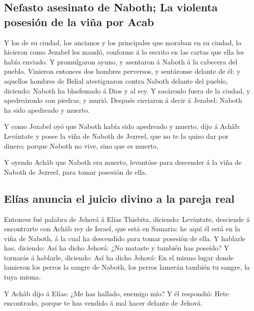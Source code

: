 \hypertarget{nefasto-asesinato-de-naboth-la-violenta-posesiuxf3n-de-la-viuxf1a-por-acab}{%
\subsection{Nefasto asesinato de Naboth; La violenta posesión de la viña
por
Acab}\label{nefasto-asesinato-de-naboth-la-violenta-posesiuxf3n-de-la-viuxf1a-por-acab}}

 Y los de su ciudad, los ancianos y los principales que
moraban en su ciudad, lo hicieron como Jezabel les mandó, conforme á lo
escrito en las cartas que ella les había enviado.  Y
promulgaron ayuno, y asentaron á Naboth á la cabecera del pueblo.
 Vinieron entonces dos hombres perversos, y sentáronse
delante de él: y aquellos hombres de Belial atestiguaron contra Naboth
delante del pueblo, diciendo: Naboth ha blasfemado á Dios y al rey. Y
sacáronlo fuera de la ciudad, y apedreáronlo con piedras, y murió.
 Después enviaron á decir á Jezabel: Naboth ha sido
apedreado y muerto.

 Y como Jezabel oyó que Naboth había sido apedreado y
muerto, dijo á Achâb: Levántate y posee la viña de Naboth de Jezreel,
que no te la quiso dar por dinero; porque Naboth no vive, sino que es
muerto.

 Y oyendo Achâb que Naboth era muerto, levantóse para
descender á la viña de Naboth de Jezreel, para tomar posesión de ella.

\hypertarget{eluxedas-anuncia-el-juicio-divino-a-la-pareja-real}{%
\subsection{Elías anuncia el juicio divino a la pareja
real}\label{eluxedas-anuncia-el-juicio-divino-a-la-pareja-real}}

 Entonces fué palabra de Jehová á Elías Thisbita,
diciendo:  Levántate, desciende á encontrarte con Achâb
rey de Israel, que está en Samaria: he aquí él está en la viña de
Naboth, á la cual ha descendido para tomar posesión de ella.
 Y hablarle has, diciendo: Así ha dicho Jehová: ¿No
mataste y también has poseído? Y tornarás á hablarle, diciendo: Así ha
dicho Jehová: En el mismo lugar donde lamieron los perros la sangre de
Naboth, los perros lamerán también tu sangre, la tuya misma.

 Y Achâb dijo á Elías: ¿Me has hallado, enemigo mío? Y él
respondió: Hete encontrado, porque te has vendido á mal hacer delante de
Jehová.

